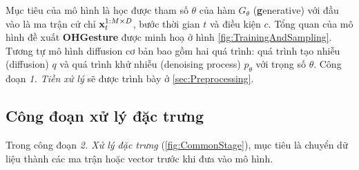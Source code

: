 Mục tiêu của mô hình là học được tham số $\theta$ của hàm $G_{\theta}$ (\textbf{g}enerative) với đầu vào là ma trận cử chỉ $\mathbf{x}^{1:M \times D}_t$, bước thời gian $t$ và điều kiện $c$.
Tổng quan của mô hình đề xuất \textbf{OHGesture} được minh hoạ ở hình \autoref{fig:TrainingAndSampling}. Tương tự mô hình diffusion cơ bản bao gồm hai quá trình: quá trình tạo nhiễu (diffusion) $q$ và quá trình khử nhiễu (denoising process) $p_{\theta}$ với trọng số $\theta$. Công đoạn \textit{1. Tiền xử lý} sẽ được trình bày ở \autoref{sec:Preprocessing}.

\subsection{Công đoạn xử lý đặc trưng}
Trong công đoạn \textit{2. Xử lý đặc trưng} (\autoref{fig:CommonStage}), mục tiêu là chuyển dữ liệu  thành các ma trận hoặc vector trước khi đưa vào mô hình.

